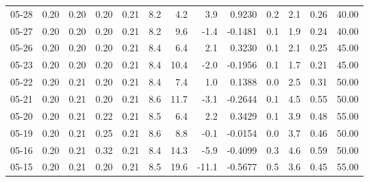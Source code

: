 \begin{threeparttable}
{\begin{tabular}{lrrrrrrrrrrrr}
  05-28 &          0.20 &          0.20 &          0.20 &        0.21 &                 8.2 &                 4.2 &        3.9 &       0.9230 &                 0.2 &              2.1 &            0.26 &                  40.00 \\
  05-27 &          0.20 &          0.20 &          0.20 &        0.21 &                 8.2 &                 9.6 &       -1.4 &      -0.1481 &                 0.1 &              1.9 &            0.24 &                  40.00 \\
  05-26 &          0.20 &          0.20 &          0.20 &        0.21 &                 8.4 &                 6.4 &        2.1 &       0.3230 &                 0.1 &              2.1 &            0.25 &                  45.00 \\
  05-23 &          0.20 &          0.20 &          0.20 &        0.21 &                 8.4 &                10.4 &       -2.0 &      -0.1956 &                 0.1 &              1.7 &            0.21 &                  45.00 \\
  05-22 &          0.20 &          0.21 &          0.20 &        0.21 &                 8.4 &                 7.4 &        1.0 &       0.1388 &                 0.0 &              2.5 &            0.31 &                  50.00 \\
  05-21 &          0.20 &          0.21 &          0.20 &        0.21 &                 8.6 &                11.7 &       -3.1 &      -0.2644 &                 0.1 &              4.5 &            0.55 &                  50.00 \\
  05-20 &          0.20 &          0.21 &          0.22 &        0.21 &                 8.5 &                 6.4 &        2.2 &       0.3429 &                 0.1 &              3.9 &            0.48 &                  55.00 \\
  05-19 &          0.20 &          0.21 &          0.25 &        0.21 &                 8.6 &                 8.8 &       -0.1 &      -0.0154 &                 0.0 &              3.7 &            0.46 &                  50.00 \\
  05-16 &          0.20 &          0.21 &          0.32 &        0.21 &                 8.4 &                14.3 &       -5.9 &      -0.4099 &                 0.3 &              4.6 &            0.59 &                  50.00 \\
  05-15 &          0.20 &          0.21 &          0.20 &        0.21 &                 8.5 &                19.6 &      -11.1 &      -0.5677 &                 0.5 &              3.6 &            0.45 &                  55.00 \\

\end{tabular}}
\end{threeparttable}
